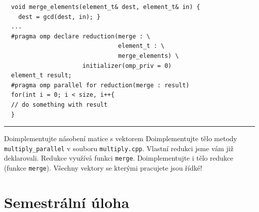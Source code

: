 \documentclass[usenames,dvipsnames,9pt]{beamer}
\begin{document}
{
\begin{frame}[fragile]

  \begin{verbatim}
  void merge_elements(element_t& dest, element_t& in) {
  	dest = gcd(dest, in); }
  ...
  #pragma omp declare reduction(merge : \
                                element_t : \
                                merge_elements) \
  	                  initializer(omp_priv = 0)
  element_t result;
  #pragma omp parallel for reduction(merge : result)
  for(int i = 0; i < size, i++{
  // do something with result
  }
 \end{verbatim}
 
  \vspace{1em}\pause\hrule\vspace{1em}

  \begin{block}{Doimplementujte násobení matice s vektorem}
    Doimplementujte tělo metody \texttt{multiply\_parallel} v souboru \texttt{multiply.cpp}. Vlastní redukci jsme vám již deklarovali. Redukce využívá funkci \texttt{merge}. Doimplementujte i tělo redukce (funkce \texttt{merge}). Všechny vektory se kterými pracujete jsou řídké!
  \end{block}

\end{frame}
}

\section{Semestrální úloha}
\end{document}
